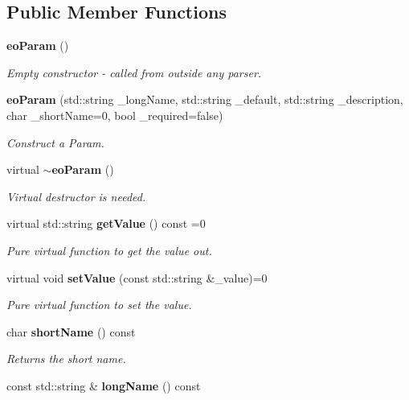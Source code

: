 \subsection*{Public Member Functions}
\begin{CompactItemize}
\item 
{\bf eo\-Param} ()\label{classeo_param_a0}

\begin{CompactList}\small\item\em Empty constructor - called from outside any parser. \item\end{CompactList}\item 
{\bf eo\-Param} (std::string \_\-long\-Name, std::string \_\-default, std::string \_\-description, char \_\-short\-Name=0, bool \_\-required=false)
\begin{CompactList}\small\item\em Construct a Param. \item\end{CompactList}\item 
virtual {\bf $\sim$eo\-Param} ()\label{classeo_param_a2}

\begin{CompactList}\small\item\em Virtual destructor is needed. \item\end{CompactList}\item 
virtual std::string {\bf get\-Value} () const =0\label{classeo_param_a3}

\begin{CompactList}\small\item\em Pure virtual function to get the value out. \item\end{CompactList}\item 
virtual void {\bf set\-Value} (const std::string \&\_\-value)=0\label{classeo_param_a4}

\begin{CompactList}\small\item\em Pure virtual function to set the value. \item\end{CompactList}\item 
char {\bf short\-Name} () const \label{classeo_param_a5}

\begin{CompactList}\small\item\em Returns the short name. \item\end{CompactList}\item 
const std::string \& {\bf long\-Name} () const \label{classeo_param_a6}


\end{CompactItemize}
